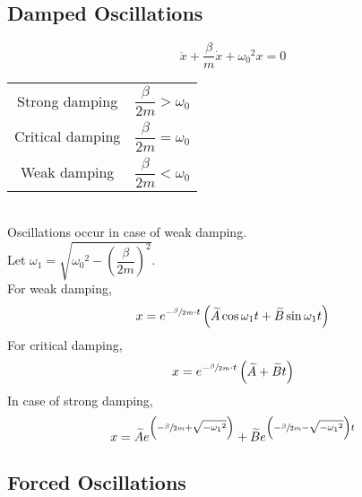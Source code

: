 \documentclass[fleqn, a5paper]{amsart}
\theoremstyle{definition}
\theoremstyle{theorem}
\begin{document}
\subsection{Damped Oscillations}

\begin{equation*}
	\ddot{x} + \dfrac{\beta}{m} \dot{x} + {\omega_0}^2 x = 0
\end{equation*}

\begin{tabular}{c c}
	Strong damping & $\dfrac{\beta}{2m} > \omega_0$\\[2ex]
	Critical damping & $\dfrac{\beta}{2m} = \omega_0$\\[2ex]
	Weak damping & $\dfrac{\beta}{2m} < \omega_0$\\[2ex]
\end{tabular}\\
Oscillations occur in case of weak damping.\\

Let $\omega_1 = \sqrt{{\omega_0}^2 - \left( \dfrac{\beta}{2m} \right)^2}$.\\
For weak damping,
\begin{equation*}
	x = e^{-\sfrac{\beta}{2m} \cdot t} \left( \widetilde{A} \cos \omega_1 t + \widetilde{B} \sin \omega_1 t \right)
\end{equation*}
For critical damping,
\begin{equation*}
	x = e^{-\sfrac{\beta}{2m} \cdot t} \left( \widetilde{A} + \widetilde{B} t \right)
\end{equation*}
In case of strong damping,
\begin{equation*}
	x = \widetilde{A} e^{\left( -\sfrac{\beta}{2m} + \sqrt{-{\omega_1}^2} \right)} + \widetilde{B} e^{\left( -\sfrac{\beta}{2m} - \sqrt{-{\omega_1}^2} \right) t}
\end{equation*}

\subsection{Forced Oscillations}
\end{document}
